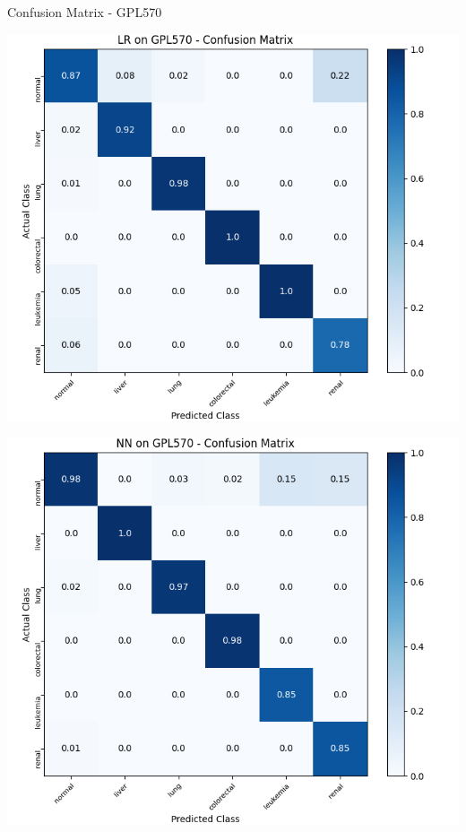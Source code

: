 \documentclass{beamer}
\begin{document}
    \begin{frame}{Confusion Matrix - GPL570}
        \begin{center}
            \hspace{-60pt}
            \begin{minipage}{0.4\textwidth}
                \includegraphics[scale=.40]{LRonGPL570Confusion.png}
            \end{minipage}
            \hspace{30pt}
            \begin{minipage}{0.4\textwidth}
                \includegraphics[scale=.40]{NNonGPL570Confusion.png}
            \end{minipage}
        \end{center}
    \end{frame}
\end{document}
